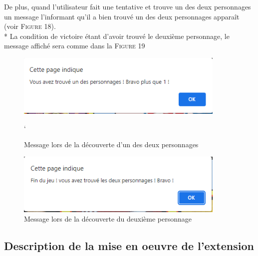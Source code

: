 \documentclass{article}
\begin{document}
            \pagebreak
        
            De plus, quand l'utilisateur fait une tentative et trouve un des deux personnages un message l'informant qu'il a bien trouvé un des deux personnages apparaît (voir \textsc{Figure 18}).\\*
            La condition de victoire étant d'avoir trouvé le deuxième personnage, le message affiché sera comme dans la \textsc{Figure 19}\\
            \begin{figure}[h]
                \centering
                \includegraphics[width=10cm]{images/DecouverteD'unPersonnage.png}
                \caption{Message lors de la découverte d'un des deux personnages}
            `\end{figure}
            
            \begin{figure}[h]
                \centering
                \includegraphics[width=10cm]{images/DecouverteDuPersonnageDeux.png}
                \caption{Message lors de la découverte du deuxième personnage}
            \end{figure}
            
        \subsection{Description de la mise en oeuvre de l'extension}
\end{document}
